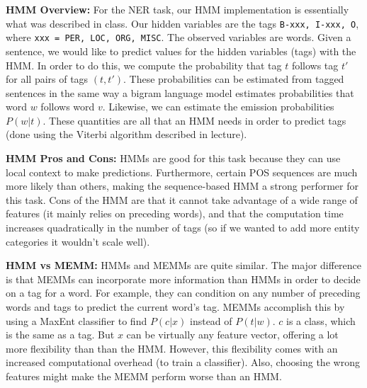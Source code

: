 \documentclass[12pt]{article}
\begin{document}
\maketitle
\textbf{HMM Overview:}
For the NER task, our HMM implementation is essentially what was described in class. Our hidden variables are the tags {\tt B-xxx, I-xxx, O}, where {\tt xxx = PER, LOC, ORG, MISC}. The observed variables are words. Given a sentence, we would like to predict values for the hidden variables (tags) with the HMM. In order to do this, we compute the probability that tag $t$ follows tag $t'$ for all pairs of tags $(t, t')$. These probabilities can be estimated from tagged sentences in the same way a bigram language model estimates probabilities that word $w$ follows word $v$. Likewise, we can estimate the emission probabilities $P(w|t)$. These quantities are all that an HMM needs in order to predict tags (done using the Viterbi algorithm described in lecture). 

\textbf{HMM Pros and Cons:} HMMs are good for this task because they can use local context to make predictions. Furthermore, certain POS sequences are much more likely than others, making the sequence-based HMM a strong performer for this task. Cons of the HMM are that it cannot take advantage of a wide range of features (it mainly relies on preceding words), and that the computation time increases quadratically in the number of tags (so if we wanted to add more entity categories it wouldn't scale well).   

\textbf{HMM vs MEMM:} HMMs and MEMMs are quite similar. The major difference is that MEMMs can incorporate more information than HMMs in order to decide on a tag for a word. For example, they can condition on any number of preceding words and tags to predict the current word's tag. MEMMs accomplish this by using a MaxEnt classifier to find $P(c|x)$ instead of $P(t|w)$. $c$ is a class, which is the same as a tag. But $x$ can be virtually any feature vector, offering a lot more flexibility than than the HMM. However, this flexibility comes with an increased computational overhead (to train a classifier). Also, choosing the wrong features might make the MEMM perform worse than an HMM.   
\end{document}
